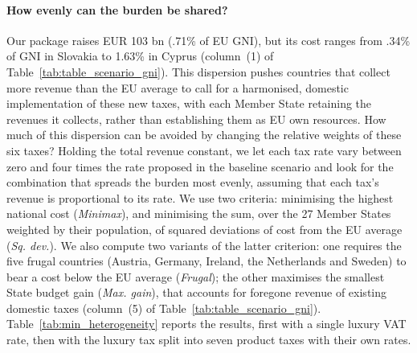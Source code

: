 \documentclass[a4paper, 11pt]{article}
\begin{document}
\paragraph{How evenly can the burden be shared?}
Our package raises EUR 103 bn (.71\% of EU GNI), but its cost ranges from .34\% of GNI in Slovakia to 1.63\% in Cyprus (column~(1) of Table~\ref{tab:table_scenario_gni}). This dispersion pushes countries that collect more revenue than the EU average to call for a harmonised, domestic  implementation of these new taxes, with each Member State retaining the revenues it collects, rather than establishing them as EU own resources.  How much of this dispersion can be avoided by changing the relative weights of these six taxes? Holding the total revenue constant, we let each tax rate vary between zero and four times the rate 
proposed in the baseline scenario and look for the combination that spreads the burden most evenly, assuming that each tax's revenue is proportional to its rate. We use two criteria: minimising the highest national cost (\textit{Minimax}), and minimising the sum, over the 27 Member States weighted by their population, of squared deviations of cost from the EU average (\textit{Sq. dev.}). We also compute two variants of the latter criterion: one requires the five frugal countries (Austria, Germany, Ireland, the Netherlands and Sweden) to bear a cost below the EU average (\textit{Frugal}); the other maximises the smallest State budget gain (\textit{Max. gain}), that accounts for foregone revenue of existing domestic taxes (column~(5) of Table~\ref{tab:table_scenario_gni}). Table~\ref{tab:min_heterogeneity} reports the results, first with a single luxury VAT rate, then with the luxury tax split into seven product taxes with their own rates. %
\end{document}
